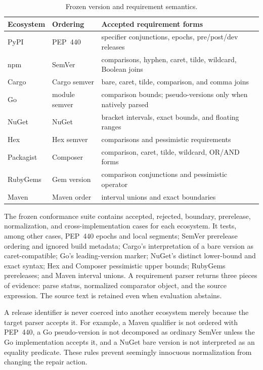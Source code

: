 \documentclass[10pt,conference]{IEEEtran}
\newcommand{\suppTableFont}{\footnotesize}
\begin{document}
\begin{table}[t]
\centering
\caption{Frozen version and requirement semantics.}
\suppTableFont
\begin{tabularx}{\columnwidth}{p{1.25cm}p{1.9cm}X}
\toprule
Ecosystem & Ordering & Accepted requirement forms \\
\midrule
PyPI & PEP~440 & specifier conjunctions, epochs, pre/post/dev releases \\
npm & SemVer & comparisons, hyphen, caret, tilde, wildcard, Boolean joins \\
Cargo & Cargo semver & bare, caret, tilde, comparison, and comma joins \\
Go & module semver & comparison bounds; pseudo-versions only when natively parsed \\
NuGet & NuGet & bracket intervals, exact bounds, and floating ranges \\
Hex & Hex semver & comparisons and pessimistic requirements \\
Packagist & Composer & comparison, caret, tilde, wildcard, OR/AND forms \\
RubyGems & Gem version & comparison conjunctions and pessimistic operator \\
Maven & Maven order & interval unions and exact boundaries \\
\bottomrule
\end{tabularx}
\end{table}

The frozen conformance suite contains accepted, rejected, boundary, prerelease, normalization, and cross-implementation cases for each ecosystem. It tests, among other cases, PEP~440 epochs and local segments; SemVer prerelease ordering and ignored build metadata; Cargo's interpretation of a bare version as caret-compatible; Go's leading-version marker; NuGet's distinct lower-bound and exact syntax; Hex and Composer pessimistic upper bounds; RubyGems prereleases; and Maven interval unions. A requirement parser returns three pieces of evidence: parse status, normalized comparator object, and the source expression. The source text is retained even when evaluation abstains.

A release identifier is never coerced into another ecosystem merely because the target parser accepts it. For example, a Maven qualifier is not ordered with PEP~440, a Go pseudo-version is not decomposed as ordinary SemVer unless the Go implementation accepts it, and a NuGet bare version is not interpreted as an equality predicate. These rules prevent seemingly innocuous normalization from changing the repair action.
\end{document}
